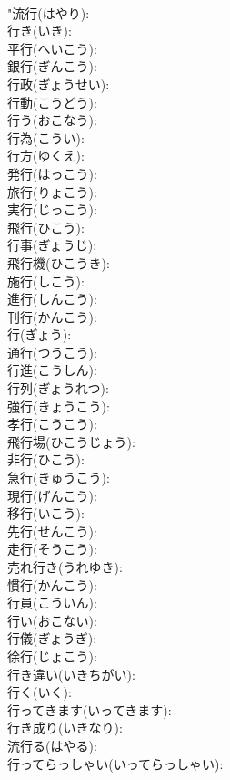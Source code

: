 \documentclass[8pt]{extreport}
\begin{document}
\begin{CJK}{UTF8}{min}
\\	"流行(はやり): 
\\	行き(いき): 
\\	平行(へいこう): 
\\	銀行(ぎんこう): 
\\	行政(ぎょうせい): 
\\	行動(こうどう): 
\\	行う(おこなう): 
\\	行為(こうい): 
\\	行方(ゆくえ): 
\\	発行(はっこう): 
\\	旅行(りょこう): 
\\	実行(じっこう): 
\\	飛行(ひこう): 
\\	行事(ぎょうじ): 
\\	飛行機(ひこうき): 
\\	施行(しこう): 
\\	進行(しんこう): 
\\	刊行(かんこう): 
\\	行(ぎょう): 
\\	通行(つうこう): 
\\	行進(こうしん): 
\\	行列(ぎょうれつ): 
\\	強行(きょうこう): 
\\	孝行(こうこう): 
\\	飛行場(ひこうじょう): 
\\	非行(ひこう): 
\\	急行(きゅうこう): 
\\	現行(げんこう): 
\\	移行(いこう): 
\\	先行(せんこう): 
\\	走行(そうこう): 
\\	売れ行き(うれゆき): 
\\	慣行(かんこう): 
\\	行員(こういん): 
\\	行い(おこない): 
\\	行儀(ぎょうぎ): 
\\	徐行(じょこう): 
\\	行き違い(いきちがい): 
\\	行く(いく): 
\\	行ってきます(いってきます): 
\\	行き成り(いきなり): 
\\	流行る(はやる): 
\\	行ってらっしゃい(いってらっしゃい): 

\end{CJK}
\end{document}
